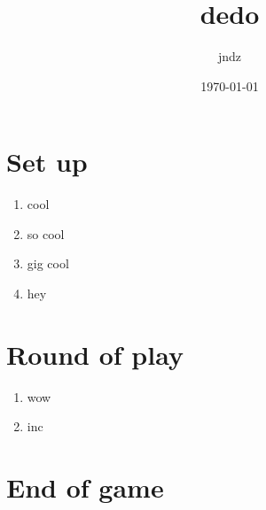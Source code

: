 \documentclass{article}%
\title{dedo}%
\author{jndz}%
\date{\today}%
\begin{document}
%
\pagestyle{empty}%
\normalsize%
\maketitle%
\section{ Set up
}%
\label{sec:Setup}%
\begin{enumerate}%
\item%
 cool
%
\item%
 so cool
%
\item%
 gig cool
%
\item%
 hey
%
\end{enumerate}

%
\section{ Round of play
}%
\label{sec:Roundofplay}%
\begin{enumerate}%
\item%
 wow
%
\item%
 inc
%
\end{enumerate}

%
\section{ End of game}%
\label{sec:Endofgame}%

%
\end{document}
